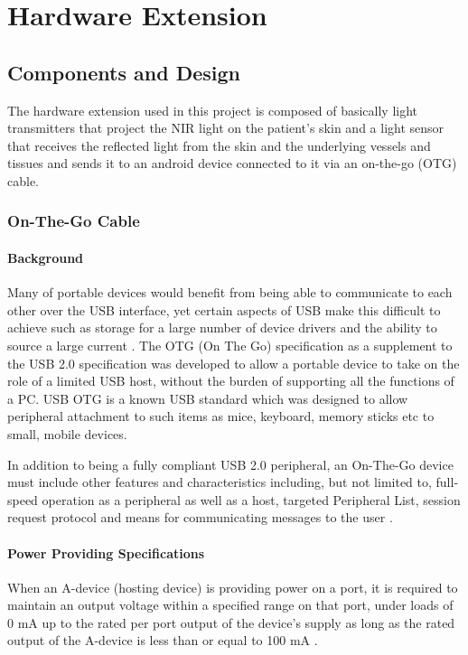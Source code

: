 
\chapter{Hardware Extension}\label{chapter:Hardware Extension}

\section{Components and Design}
The hardware extension used in this project is composed of basically light transmitters that project the NIR light on the patient’s skin and a light sensor that receives the reflected light from the skin and the underlying vessels and tissues and sends it to an android device connected to it via an on-the-go (OTG) cable.

\subsection{On-The-Go Cable}
\subsubsection{Background}
Many of portable devices would benefit from being able to communicate to each other over the USB interface, yet certain aspects of USB make this difficult to achieve such as storage for a large number of device drivers and the ability to source a large current \parencite{otg}.
The OTG (On The Go) specification as a supplement to the USB 2.0 specification was developed to allow a portable device to take on the role of a limited USB host, without the burden of supporting all the functions of a PC.
USB OTG is a known USB standard which was designed to allow peripheral attachment to such items as mice, keyboard, memory sticks etc to small, mobile devices.

In addition to being a fully compliant USB 2.0 peripheral, an On-The-Go device must include other features and characteristics including, but not limited to, full-speed operation as a peripheral as well as a host, targeted Peripheral List, session request protocol and means for communicating messages to the user \parencite{otg}.

\subsubsection{Power Providing Specifications}
When an A-device (hosting device) is providing power on a port, it is required to maintain an output voltage within a specified range on that port, under loads of 0 mA up to the rated per port output of the device’s supply as long as the rated output of the A-device is less than or equal to 100 mA \parencite{otg}.

